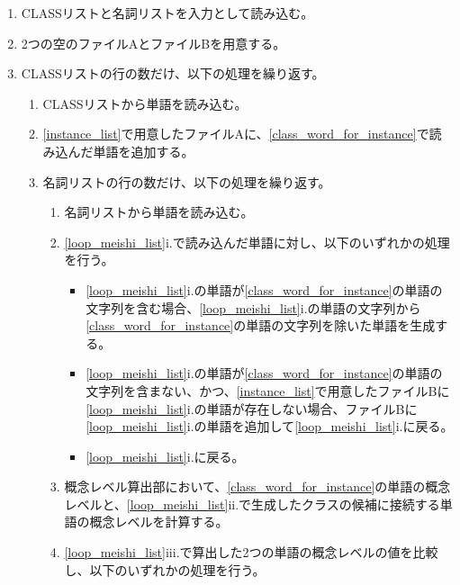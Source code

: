 \begin{enumerate}
    \item CLASSリストと名詞リストを入力として読み込む。
    \item 2つの空のファイルAとファイルBを用意する。
    \label{instance_list}
    \item CLASSリストの行の数だけ、以下の処理を繰り返す。
        \begin{enumerate}
            \item CLASSリストから単語を読み込む。
            \label{class_word_for_instance}
            \item \ref{instance_list}で用意したファイルAに、\ref{class_word_for_instance}で読み込んだ単語を追加する。
            \label{instance_list2}
            \item 名詞リストの行の数だけ、以下の処理を繰り返す。
            \label{loop_meishi_list}
                \begin{enumerate}
                    \item 名詞リストから単語を読み込む。
                    \label{meishi_word}
                    \item \ref{loop_meishi_list}i.で読み込んだ単語に対し、以下のいずれかの処理を行う。
                        \begin{itemize}
                            \item \ref{loop_meishi_list}i.の単語が\ref{class_word_for_instance}の単語の文字列を含む場合、\ref{loop_meishi_list}i.の単語の文字列から\ref{class_word_for_instance}の単語の文字列を除いた単語を生成する。
                            \label{remove_class_word}
                            \item \ref{loop_meishi_list}i.の単語が\ref{class_word_for_instance}の単語の文字列を含まない、かつ、\ref{instance_list}で用意したファイルBに\ref{loop_meishi_list}i.の単語が存在しない場合、ファイルBに\ref{loop_meishi_list}i.の単語を追加して\ref{loop_meishi_list}i.に戻る。
                            \item \ref{loop_meishi_list}i.に戻る。
                        \end{itemize}
                    \item 概念レベル算出部において、\ref{class_word_for_instance}の単語の概念レベルと、\ref{loop_meishi_list}ii.で生成したクラスの候補に接続する単語の概念レベルを計算する。
                    \label{calc_concept_class_meishi}
                    \item \ref{loop_meishi_list}iii.で算出した2つの単語の概念レベルの値を比較し、以下のいずれかの処理を行う。

\end{enumerate}
\end{enumerate}
\end{enumerate}
